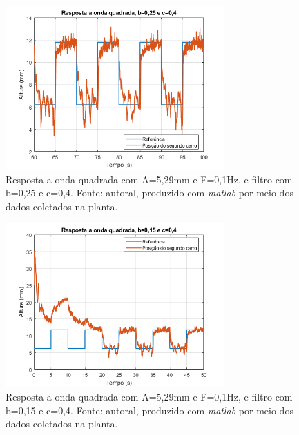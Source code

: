 \documentclass{ifacconf}
\begin{document}
\begin{figure}[!htb]
  \begin{center}
  \includegraphics[width=8.4cm]{figures/resultado_teste1.png}    %
  \caption{Resposta a onda quadrada com A=5,29mm e F=0,1Hz, e filtro com b=0,25 e c=0,4. Fonte: autoral, produzido com \textit{matlab} por meio dos dados coletados na planta.} 
  \label{fig:teste1}
  \end{center}
\end{figure}

\begin{figure}[!htb]
  \begin{center}
  \includegraphics[width=8.4cm]{figures/resultado_teste2.png}    %
  \caption{Resposta a onda quadrada com A=5,29mm e F=0,1Hz, e filtro com b=0,15 e c=0,4. Fonte: autoral, produzido com \textit{matlab} por meio dos dados coletados na planta.} 
  \label{fig:teste2}
  \end{center}
\end{figure}
\end{document}
